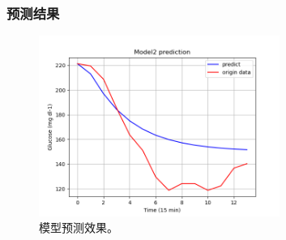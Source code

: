 \documentclass{beamer}
\begin{document}
\begin{frame}
    \frametitle{预测结果}
    \begin{figure}[H]
        \centering
        \includegraphics[width=0.7\textwidth]{Img/predict.png}
        \caption{模型预测效果。}
    \end{figure}
\end{frame}
\end{document}
